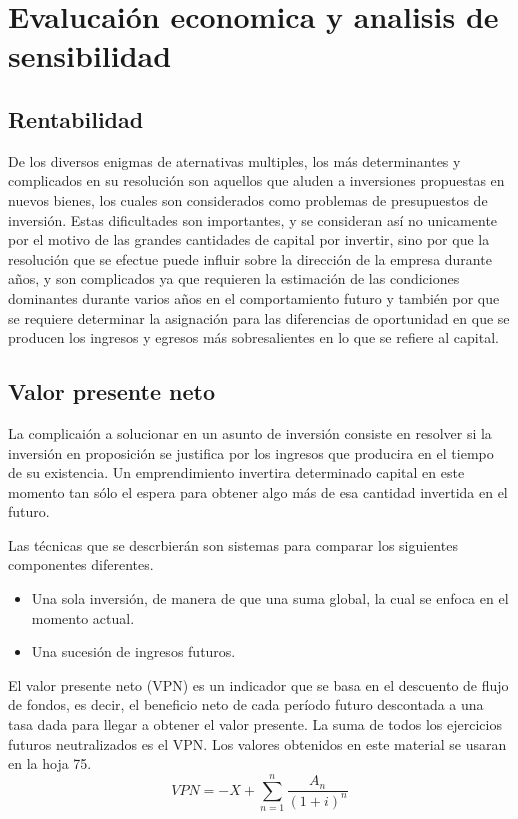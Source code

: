 \chapter{Evalucaión economica y analisis de sensibilidad}
\section{Rentabilidad}
De los diversos enigmas de aternativas multiples, los más determinantes y complicados en su
resolución son aquellos que aluden a inversiones propuestas en nuevos bienes, los cuales son
considerados como problemas de presupuestos de inversión. Estas dificultades son importantes,
y se consideran así no unicamente por el motivo de las grandes cantidades de capital por invertir,
sino por que la resolución que se efectue puede influir sobre la dirección de la empresa
durante años, y son complicados ya que requieren la estimación de las condiciones dominantes
durante varios años en el comportamiento futuro y también por que se requiere determinar la
asignación para las diferencias de oportunidad en que se producen los ingresos y egresos más
sobresalientes en lo que se refiere al capital.
\section{Valor presente neto}
La complicaión a solucionar en un asunto de inversión consiste en resolver si la inversión
en proposición se justifica por los ingresos que producira en el tiempo de su existencia. Un
emprendimiento invertira determinado capital en este momento tan sólo el espera para obtener
algo más de esa cantidad invertida en el futuro.

Las técnicas que se descrbierán son sistemas para comparar los siguientes componentes diferentes.
\begin{itemize}
    \item Una sola inversión, de manera de que una suma global, la cual se enfoca en el momento actual.
    \item Una sucesión de ingresos futuros.
\end{itemize}

El valor presente neto (VPN) es un indicador que se basa en el descuento de flujo de fondos, es decir,
el beneficio neto de cada período futuro descontada a una tasa dada para llegar a obtener el valor
presente. La suma de todos los ejercicios futuros neutralizados es el VPN. Los valores obtenidos en este
material se usaran en la hoja 75.
\[VPN=-X+\sum_{n = 1}^{n}\frac{A_n}{(1+i)^n}\]

